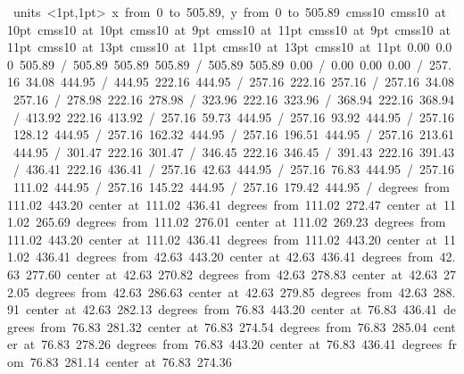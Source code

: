 \hbox{\beginpicture
\setcoordinatesystem units <1pt,1pt>
\setplotarea x from 0 to 505.89, y from 0 to 505.89
\setlinear
\font\picfont cmss10\picfont
\font\picfont cmss10 at 10pt\picfont
\font\picfont cmss10 at 10pt\picfont
\font\picfont cmss10 at 9pt\picfont
\font\picfont cmss10 at 11pt\picfont
\font\picfont cmss10 at 9pt\picfont
\font\picfont cmss10 at 11pt\picfont
\font\picfont cmss10 at 13pt\picfont
\font\picfont cmss10 at 11pt\picfont
\font\picfont cmss10 at 13pt\picfont
\font\picfont cmss10 at 11pt\picfont
\setsolid
{} 0.00 0.00 505.89 /
 505.89 505.89 505.89 /
 505.89 505.89 0.00 /
 0.00 0.00 0.00 /
\setsolid
{} 257.16 34.08 444.95 /
 444.95 222.16 444.95 /
 257.16 222.16 257.16 /
 257.16 34.08 257.16 /
\setsolid
{} 278.98 222.16 278.98 /
\setsolid
{} 323.96 222.16 323.96 /
\setsolid
{} 368.94 222.16 368.94 /
\setsolid
{} 413.92 222.16 413.92 /
\setsolid
{} 257.16 59.73 444.95 /
\setsolid
{} 257.16 93.92 444.95 /
\setsolid
{} 257.16 128.12 444.95 /
\setsolid
{} 257.16 162.32 444.95 /
\setsolid
{} 257.16 196.51 444.95 /
\setsolid
{} 257.16 213.61 444.95 /
\setsolid
{} 301.47 222.16 301.47 /
\setsolid
{} 346.45 222.16 346.45 /
\setsolid
{} 391.43 222.16 391.43 /
\setsolid
{} 436.41 222.16 436.41 /
\setsolid
{} 257.16 42.63 444.95 /
\setsolid
{} 257.16 76.83 444.95 /
\setsolid
{} 257.16 111.02 444.95 /
\setsolid
{} 257.16 145.22 444.95 /
\setsolid
{} 257.16 179.42 444.95 /
 degrees from 111.02 443.20 center at 111.02 436.41
 degrees from 111.02 272.47 center at 111.02 265.69
 degrees from 111.02 276.01 center at 111.02 269.23
 degrees from 111.02 443.20 center at 111.02 436.41
 degrees from 111.02 443.20 center at 111.02 436.41
 degrees from 42.63 443.20 center at 42.63 436.41
 degrees from 42.63 277.60 center at 42.63 270.82
 degrees from 42.63 278.83 center at 42.63 272.05
 degrees from 42.63 286.63 center at 42.63 279.85
 degrees from 42.63 288.91 center at 42.63 282.13
 degrees from 76.83 443.20 center at 76.83 436.41
 degrees from 76.83 281.32 center at 76.83 274.54
 degrees from 76.83 285.04 center at 76.83 278.26
 degrees from 76.83 443.20 center at 76.83 436.41
 degrees from 76.83 281.14 center at 76.83 274.36
}
